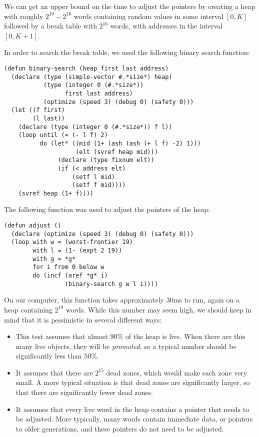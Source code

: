 We can get an upper bound on the time to adjust the pointers by
creating a heap with roughly $2^{19} - 2^{16}$ words containing random
values in some interval $[0,K]$ followed by a break table with
$2^{16}$ words, with addresses in the interval $[0,K+1]$.

In order to search the break table, we used the following binary
search function:

{\small\begin{verbatim}
(defun binary-search (heap first last address)
  (declare (type (simple-vector #.*size*) heap)
           (type (integer 0 (#.*size*)) 
                 first last address)
           (optimize (speed 3) (debug 0) (safety 0)))
  (let ((f first)
        (l last))
    (declare (type (integer 0 (#.*size*)) f l))
    (loop until (= (- l f) 2)
          do (let* ((mid (1+ (ash (ash (+ l f) -2) 1)))
                    (elt (svref heap mid)))
               (declare (type fixnum elt))
               (if (< address elt)
                   (setf l mid)
                   (setf f mid))))
    (svref heap (1+ f))))
\end{verbatim}}

The following function was used to adjust the pointers of the heap:

{\small\begin{verbatim}
(defun adjust ()
  (declare (optimize (speed 3) (debug 0) (safety 0)))
  (loop with w = (worst-frontier 19)
        with l = (1- (expt 2 19))
        with g = *g*
        for i from 0 below w
        do (incf (aref *g* i)
                 (binary-search g w l i))))
\end{verbatim}}

On our computer, this function takes approximately $30$ms to run,
again on a heap containing $2^{19}$ words.  While this number may seem
high, we should keep in mind that it is pessimistic in several
different ways:

\begin{itemize}
\item This test assumes that almost $90\%$ of the heap is live.  When
  there are this many live objects, they will be \emph{promoted}, so a
  typical number should be significantly less than $50\%$.
\item It assumes that there are $2^{15}$ dead zones, which would make
  each zone very small.  A more typical situation is that dead zones
  are significantly larger, so that there are significantly fewer dead
  zones. 
\item It assumes that every live word in the heap contains a pointer
  that needs to be adjusted.  More typically, many words contain
  immediate data, or pointers to older generations, and these pointers
  do not need to be adjusted.
\end{itemize}

